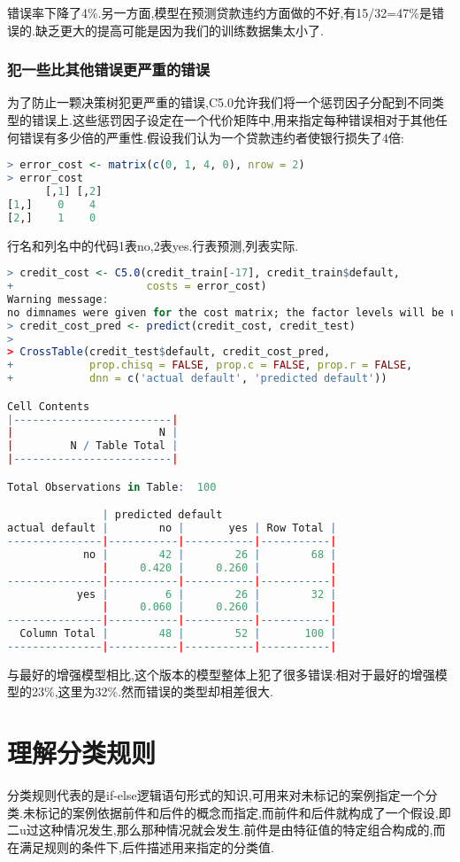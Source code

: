 \documentclass[11pt,a4paper,oneside]{book}
\begin{document}
错误率下降了4\%.另一方面,模型在预测贷款违约方面做的不好,有15/32=47\%是错误的.缺乏更大的提高可能是因为我们的训练数据集太小了.

\subsubsection{犯一些比其他错误更严重的错误}
为了防止一颗决策树犯更严重的错误,C5.0允许我们将一个惩罚因子分配到不同类型的错误上.这些惩罚因子设定在一个代价矩阵中,用来指定每种错误相对于其他任何错误有多少倍的严重性.假设我们认为一个贷款违约者使银行损失了4倍:
\begin{lstlisting}[language=r]
> error_cost <- matrix(c(0, 1, 4, 0), nrow = 2)
> error_cost
      [,1] [,2]
[1,]    0    4
[2,]    1    0
\end{lstlisting}
行名和列名中的代码1表no,2表yes.行表预测,列表实际.
\begin{lstlisting}[language=r]
> credit_cost <- C5.0(credit_train[-17], credit_train$default,
+                     costs = error_cost)
Warning message:
no dimnames were given for the cost matrix; the factor levels will be used 
> credit_cost_pred <- predict(credit_cost, credit_test)
> 
> CrossTable(credit_test$default, credit_cost_pred,
+            prop.chisq = FALSE, prop.c = FALSE, prop.r = FALSE,
+            dnn = c('actual default', 'predicted default'))

Cell Contents
|-------------------------|
|                       N |
|         N / Table Total |
|-------------------------|

Total Observations in Table:  100 

               | predicted default 
actual default |        no |       yes | Row Total | 
---------------|-----------|-----------|-----------|
            no |        42 |        26 |        68 | 
               |     0.420 |     0.260 |           | 
---------------|-----------|-----------|-----------|
           yes |         6 |        26 |        32 | 
               |     0.060 |     0.260 |           | 
---------------|-----------|-----------|-----------|
  Column Total |        48 |        52 |       100 | 
---------------|-----------|-----------|-----------|
\end{lstlisting}
与最好的增强模型相比,这个版本的模型整体上犯了很多错误:相对于最好的增强模型的23\%,这里为32\%.然而错误的类型却相差很大.

\section{理解分类规则}
分类规则代表的是if-else逻辑语句形式的知识,可用来对未标记的案例指定一个分类.未标记的案例依据前件和后件的概念而指定,而前件和后件就构成了一个假设,即二u过这种情况发生,那么那种情况就会发生.前件是由特征值的特定组合构成的,而在满足规则的条件下,后件描述用来指定的分类值.
\end{document}
